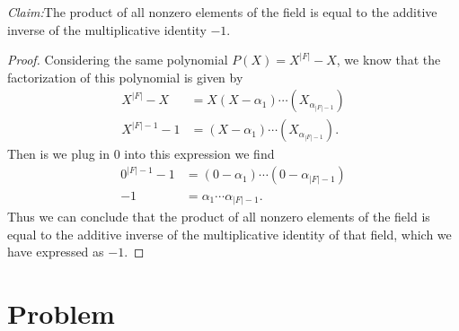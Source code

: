 \documentclass[10pt]{amsart}
\newenvironment{claim}[1]{\par\noindent\textit{Claim:}\space#1}{}
\begin{document}
\begin{claim}
  The product of all nonzero elements of the field is equal to the additive
  inverse of the multiplicative identity $-1$.
\end{claim}
\begin{proof}
  Considering the same polynomial $P(X)=X^{|F|}-X$, we know that the
  factorization of this polynomial is given by
  \begin{align*}
    X^{|F|}-X&=X(X-\alpha_1)\cdots(X_\alpha_{|F|-1})\\
    X^{|F|-1}-1&=(X-\alpha_1)\cdots(X_\alpha_{|F|-1}).
  \end{align*}
  Then is we plug in $0$ into this expression we find
  \begin{align*}
    0^{|F|-1}-1&=(0-\alpha_1)\cdots(0-\alpha_{|F|-1})\\
    -1&=\alpha_1\cdots\alpha_{|F|-1}.
  \end{align*}
  Thus we can conclude that the product of all nonzero elements of the field is
  equal to the additive inverse of the multiplicative identity of that field,
  which we have expressed as $-1$.
\end{proof}

\section{Problem}%
\label{sec:problem_4}
\end{document}
